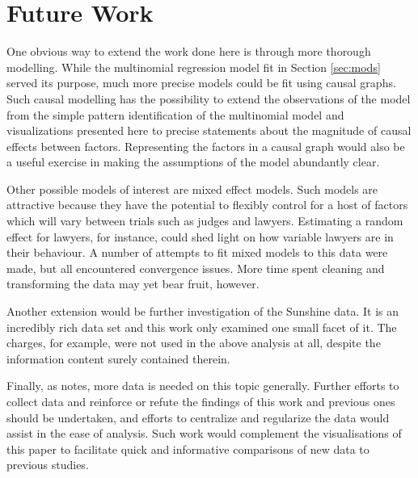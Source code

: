 \section{Future Work}
\label{sec:FutureWork}

One obvious way to extend the work done here is through more thorough modelling. While the multinomial regression model fit in
Section \ref{sec:mods} served its purpose, much more precise models could be fit using causal graphs. Such causal modelling has the
possibility to extend the observations of the model from the simple pattern identification of the multinomial model and
visualizations presented here to precise statements about the magnitude of causal effects between factors. Representing the
factors in a causal graph would also be a useful exercise in making the assumptions of the model abundantly clear.

Other possible models of interest are mixed effect models. Such models are attractive because they have the potential to flexibly control for a host of factors which will vary between trials such as judges and lawyers. Estimating a random effect for lawyers,
for instance, could shed light on how variable lawyers are in their behaviour. A number of attempts to fit mixed models to this data were made, but all encountered convergence issues. More time spent cleaning and transforming the data may yet bear fruit, however.

Another extension would be further investigation of the Sunshine data. It is an incredibly rich data set and this work only
examined one small facet of it. The charges, for example, were not used in the above analysis at all, despite the information content surely contained therein.

Finally, as \cite{JurySunshineProj} notes, more data is needed on this topic generally. Further efforts to collect data and
reinforce or refute the findings of this work and previous ones should be undertaken, and efforts to centralize and regularize the
data would assist in the ease of analysis. Such work would complement the visualisations of
this paper to facilitate quick and informative comparisons of new data to previous studies.

